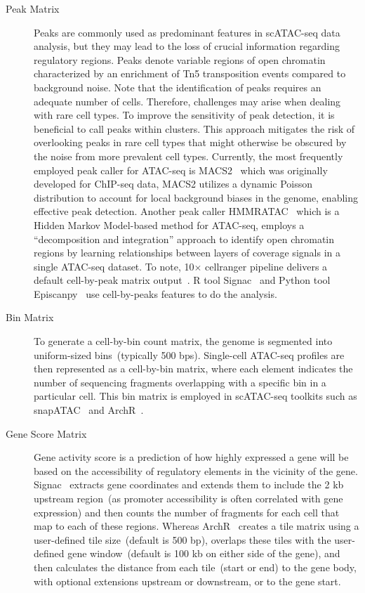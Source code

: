 \begin{description}
	\item[Peak Matrix]
	Peaks are commonly used as predominant features in scATAC-seq data analysis, but they may lead to the loss of crucial information regarding regulatory regions. Peaks denote variable regions of open chromatin characterized by an enrichment of Tn5 transposition events compared to background noise. Note that the identification of peaks requires an adequate number of cells. Therefore, challenges may arise when dealing with rare cell types. To improve the sensitivity of peak detection, it is beneficial to call peaks within clusters. This approach mitigates the risk of overlooking peaks in rare cell types that might otherwise be obscured by the noise from more prevalent cell types. Currently, the most frequently employed peak caller for ATAC-seq is MACS2~\citep{zhang2008macs2} which was originally developed for ChIP-seq data, MACS2 utilizes a dynamic Poisson distribution to account for local background biases in the genome, enabling effective peak detection. Another peak caller HMMRATAC~\citep{tarbell2019hmmratac} which is a Hidden Markov Model-based method for ATAC-seq, employs a ``decomposition and integration'' approach to identify open chromatin regions by learning relationships between layers of coverage signals in a single ATAC-seq dataset. To note, 10$\times$ cellranger pipeline delivers a default cell-by-peak matrix output~\citep{satpathy2019massively}. R tool Signac~\citep{signac} and Python tool Episcanpy~\citep{Danese2021episcanpy} use cell-by-peaks features to do the analysis.

	\item[Bin Matrix]
	To generate a cell-by-bin count matrix, the genome is segmented into uniform-sized bins~(typically 500 bps). Single-cell ATAC-seq profiles are then represented as a cell-by-bin matrix, where each element indicates the number of sequencing fragments overlapping with a specific bin in a particular cell. This bin matrix is employed in scATAC-seq toolkits such as snapATAC~\citep{fang2021snapatac} and ArchR~\citep{Granja2021}.

	\item[Gene Score Matrix]
	Gene activity score is a prediction of how highly expressed a gene will be based on the accessibility of regulatory elements in the vicinity of the gene. Signac~\citep{signac} extracts gene coordinates and extends them to include the 2 kb upstream region~(as promoter accessibility is often correlated with gene expression) and then counts the number of fragments for each cell that map to each of these regions. Whereas ArchR~\citep{granja2019single} creates a tile matrix using a user-defined tile size~(default is 500 bp), overlaps these tiles with the user-defined gene window~(default is 100 kb on either side of the gene), and then calculates the distance from each tile~(start or end) to the gene body, with optional extensions upstream or downstream, or to the gene start.
\end{description}

